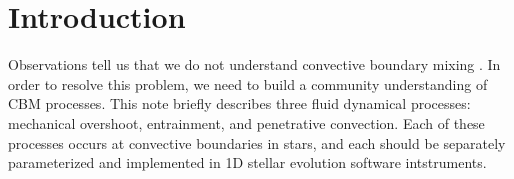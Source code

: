 \section{Introduction}
\label{sec:introduction}
Observations tell us that we do not understand convective boundary mixing \citep[CBM,][]{pinsonneault_1997, claret_torres_2018, pedersen_etal_2021}.
In order to resolve this problem, we need to build a community understanding of CBM processes.
This note briefly describes three fluid dynamical processes: mechanical overshoot, entrainment, and penetrative convection.
Each of these processes occurs at convective boundaries in stars, and each should be separately parameterized and implemented in 1D stellar evolution software intstruments.
